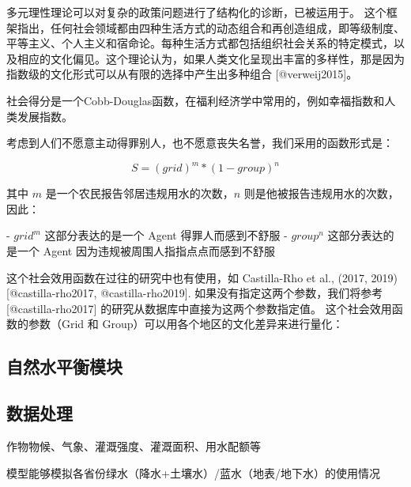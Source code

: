 多元理性理论可以对复杂的政策问题进行了结构化的诊断，已被运用于。
这个框架指出，任何社会领域都由四种生活方式的动态组合和再创造组成，即等级制度、平等主义、个人主义和宿命论。每种生活方式都包括组织社会关系的特定模式，以及相应的文化偏见。这个理论认为，如果人类文化呈现出丰富的多样性，那是因为指数级的文化形式可以从有限的选择中产生出多种组合 [@verweij2015]。

社会得分是一个Cobb-Douglas函数，在福利经济学中常用的，例如幸福指数和人类发展指数。

考虑到人们不愿意主动得罪别人，也不愿意丧失名誉，我们采用的函数形式是：

\begin{equation}
    S = {(grid)}^m * {(1 - group)}^n
    \label{ch6:eq:society}
\end{equation}

其中 $m$ 是一个农民报告邻居违规用水的次数，$n$ 则是他被报告违规用水的次数，因此：

- $grid^m$ 这部分表达的是一个 Agent 得罪人而感到不舒服
- $group^n$ 这部分表达的是一个 Agent 因为违规被周围人指指点点而感到不舒服

这个社会效用函数在过往的研究中也有使用，如 Castilla-Rho et al., (2017, 2019) [@castilla-rho2017, @castilla-rho2019]. 如果没有指定这两个参数，我们将参考 [@castilla-rho2017] 的研究从数据库中直接为这两个参数指定值。
这个社会效用函数的参数（Grid 和 Group）可以用各个地区的文化差异来进行量化：


\subsection{自然水平衡模块}

\subsection{数据处理}

作物物候、气象、灌溉强度、灌溉面积、用水配额等

模型能够模拟各省份绿水（降水+土壤水）/蓝水（地表/地下水）的使用情况
